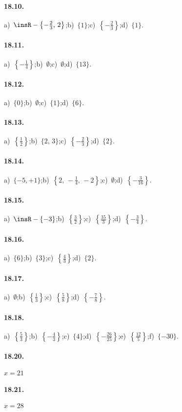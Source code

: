 \paragraph{18.10.}
a)~$\insR-\left\{-{\frac{2}{3}}\text{,~}2\right\}$;\quad b)~$\{1\}$;\quad c)~$\left\{-{\frac{2}{3}}\right\}$;\quad d)~$\{1\}$.

\paragraph{18.11.} %
a)~$\left\{-{\frac{1}{4}}\right\}$;\quad b)~$\emptyset$;\quad c)~$\emptyset$;\quad d)~$\{13\}$.

\paragraph{18.12.} %
a)~$\{0\}$;\quad b)~$\emptyset$;\quad c)~$\{1\}$;\quad d)~$\{6\}$.

\paragraph{18.13.}
a)~$\left\{\frac{1}{2}\right\}$;\quad b)~$\{2\text{,~}3\}$;\quad c)~$\left\{-\frac{2}{3}\right\}$;\quad d)~$\{2\}$.

\paragraph{18.14.}
a)~$\{-5,+1\}$;\quad b)~$\left\{2\text{,~}-\frac{1}{4}\text{,~}-2\right\}$;\quad c)~$\emptyset$;\quad d)~$\left\{-{\frac{3}{16}}\right\}$.

\paragraph{18.15.}
a)~$\insR-\{-3\}$;\quad b)~$\left\{\frac{3}{2}\right\}$;\quad c)~$\left\{\frac{35}{3}\right\}$;\quad d)~$\left\{-{\frac{3}{4}}\right\}$.

\paragraph{18.16.} %
a)~$\{6\}$;\quad b)~$\{3\}$;\quad c)~$\left\{\frac{4}{3}\right\}$;\quad d)~$\{2\}$.

\paragraph{18.17.} %
a)~$\emptyset$;\quad b)~$\left\{\frac{1}{3}\right\}$;\quad c)~$\left\{\frac{5}{8}\right\}$;\quad d)~$\left\{-{\frac{7}{8}}\right\}$.

\paragraph{18.18.}
a)~$\left\{\frac{5}{3}\right\}$;\quad b)~$\left\{-\frac{4}{3}\right\}$;\quad c)~$\{4\}$;\quad d)~$\left\{-{\frac{26}{25}}\right\}$;\quad e)~$\left\{\frac{12}{5}\right\}$;\quad f)~$\{-30\}$.

\paragraph{18.20.} $x=21$

\paragraph{18.21.} $x=28$
